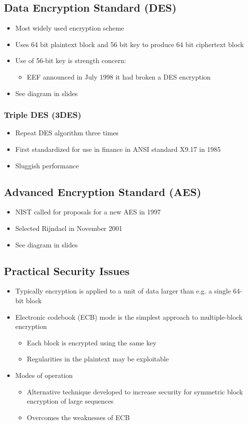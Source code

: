 \documentclass[11pt]{article}
\begin{document}
\subsection{Data Encryption Standard (DES)}
\label{sec:org1fa8f28}
\begin{itemize}
\item Most widely used encryption scheme
\item Uses 64 bit plaintext block and 56 bit key to produce 64 bit ciphertext block
\item Use of 56-bit key is strength concern:
\begin{itemize}
\item EEF announced in July 1998 it had broken a DES encryption
\end{itemize}
\item See diagram in slides
\end{itemize}
\subsubsection{Triple DES (3DES)}
\label{sec:orgb3d7d12}
\begin{itemize}
\item Repeat DES algorithm three times
\item First standardized for use in finance in ANSI standard X9.17 in 1985
\item Sluggish performance
\end{itemize}
\subsection{Advanced Encryption Standard (AES)}
\label{sec:org4ebd740}
\begin{itemize}
\item NIST called for proposals for a new AES in 1997
\item Selected Rijndael in November 2001
\item See diagram in slides
\end{itemize}
\subsection{Practical Security Issues}
\label{sec:orgb33ff6e}
\begin{itemize}
\item Typically encryption is applied to a unit  of data larger than e.g. a single 64-bit block
\item Electronic codebook (ECB) mode is the simplest approach to multiple-block encryption
\begin{itemize}
\item Each block is encrypted using the same key
\item Regularities in the plaintext may be exploitable
\end{itemize}
\item Modes of operation
\begin{itemize}
\item Alternative technique developed to increase security for symmetric block encryption of large sequences
\item Overcomes the weaknesses of ECB
\end{itemize}
\end{itemize}
\end{document}
